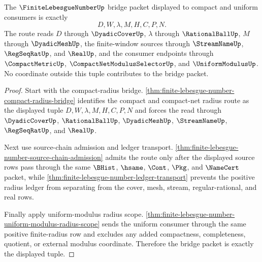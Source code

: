 \begin{theorem}
\label{thm:finite-lebesgue-number-bridge-packet-exactness}
The $\FiniteLebesgueNumberUp$ bridge packet displayed to compact and uniform consumers is exactly
$$
D,W,\lambda,M,H,C,P,N .
$$
The route reads $D$ through $\DyadicCoverUp$, $\lambda$ through $\RationalBallUp$, $M$ through $\DyadicMeshUp$, the finite-window sources through $\StreamNameUp$, $\RegSeqRatUp$, and $\RealUp$, and the consumer endpoints through $\CompactMetricUp$, $\CompactNetModulusSelectorUp$, and $\UniformModulusUp$. No coordinate outside this tuple contributes to the bridge packet.
\end{theorem}
\begin{proof}
Start with the compact-radius bridge. \autoref{thm:finite-lebesgue-number-compact-radius-bridge} identifies the compact and compact-net radius route as the displayed tuple $D,W,\lambda,M,H,C,P,N$ and forces the read through $\DyadicCoverUp$, $\RationalBallUp$, $\DyadicMeshUp$, $\StreamNameUp$, $\RegSeqRatUp$, and $\RealUp$.

Next use source-chain admission and ledger transport. \autoref{thm:finite-lebesgue-number-source-chain-admission} admits the route only after the displayed source rows pass through the same $\BHist$, $\hsame$, $\Cont$, $\Pkg$, and $\NameCert$ packet, while \autoref{thm:finite-lebesgue-number-ledger-transport} prevents the positive radius ledger from separating from the cover, mesh, stream, regular-rational, and real rows.

Finally apply uniform-modulus radius scope. \autoref{thm:finite-lebesgue-number-uniform-modulus-radius-scope} sends the uniform consumer through the same positive finite-radius row and excludes any added compactness, completeness, quotient, or external modulus coordinate. Therefore the bridge packet is exactly the displayed tuple.
\end{proof}

